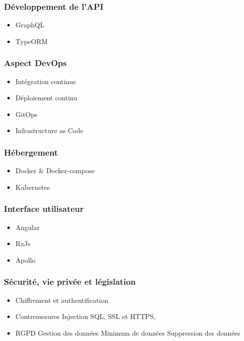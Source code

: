 \documentclass[aspectratio=169]{beamer}
\begin{document}
    \begin{frame}
        \frametitle{Développement de l'API}
        \begin{itemize}
            \item GraphQL
            \item TypeORM
        \end{itemize}
    \end{frame}

    \begin{frame}%
        \frametitle{Aspect DevOps}
        \begin{itemize}
            \item Intégration continue
            \item Déploiement continu
            \item GitOps
            \item Infrastructure as Code
        \end{itemize}
    \end{frame}

    \begin{frame}
        \frametitle{Hébergement}
        \begin{itemize}
            \item Docker & Docker-compose
            \item Kubernetes
        \end{itemize}
    \end{frame}

    \begin{frame}
        \frametitle{Interface utilisateur}
        \begin{itemize}
            \item Angular
            \item RxJs
            \item Apollo
        \end{itemize}
    \end{frame}

    \begin{frame}
        \frametitle{Sécurité, vie privée et législation}
        \begin{itemize}
            \item Chiffrement et authentification
            \item Contremesures
            \subitem Injection SQL,
            \subitem SSL et HTTPS,
            \item RGPD
            \subitem Gestion des données
            \subitem Minimum de données
            \subitem Suppression des données
        \end{itemize}
    \end{frame}
\end{document}
